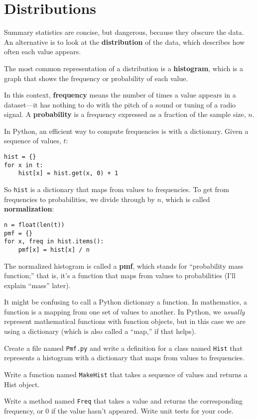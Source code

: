 \documentclass[10pt]{book}
\begin{document}
\section{Distributions}

Summary statistics are concise, but dangerous, because they obscure
the data.  An alternative is to look at the {\bf distribution} of the
data, which describes how often each value appears.

The most common representation of a distribution is a {\bf histogram},
which is a graph that shows the frequency or probability
of each value.  

In this context, {\bf frequency} means the number of times a value
appears in a dataset---it has nothing to do with the pitch of a sound
or tuning of a radio signal.  A {\bf probability} is a frequency expressed
as a fraction of the sample size, $n$.

In Python, an efficient way to compute frequencies is with a dictionary.
Given a sequence of values, $t$:

\begin{verbatim}
hist = {}
for x in t:
    hist[x] = hist.get(x, 0) + 1
\end{verbatim}

So {\tt hist} is a dictionary that maps from values to frequencies.
To get from frequencies to probabilities, we divide through by $n$,
which is called {\bf normalization}:

\begin{verbatim}
n = float(len(t))
pmf = {}
for x, freq in hist.items():
    pmf[x] = hist[x] / n
\end{verbatim}

The normalized histogram is called a {\bf pmf}, which stands for
``probability mass function;''  that is, it's a function that
maps from values to probabilities (I'll explain ``mass'' later).

It might be confusing to call a Python dictionary a function.  In
mathematics, a function is a mapping from one set of values to
another.  In Python, we {\em usually} represent mathematical functions
with function objects, but in this case we are using a dictionary
(which is also called a ``map,'' if that helps).

\begin{ex}
Create a file named {\tt Pmf.py} and write a definition for a class
named {\tt Hist} that represents a histogram with a dictionary
that maps from values to frequencies.

Write a function named {\tt MakeHist} that takes a sequence of
values and returns a Hist object.

Write a method named {\tt Freq} that takes a value and returns
the corresponding frequency, or 0
if the value hasn't appeared.  Write unit tests for your code.
\end{ex}
\end{document}
